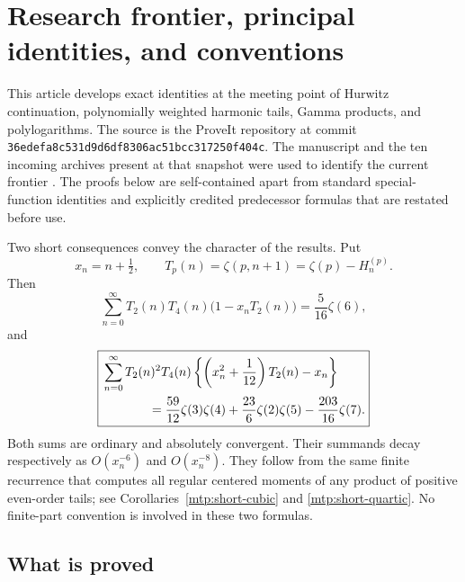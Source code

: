 \section{Research frontier, principal identities, and conventions}
\label{sec:overview}

This article develops exact identities at the meeting point of
Hurwitz continuation, polynomially weighted harmonic tails, Gamma
products, and polylogarithms. The source is the ProveIt repository
at commit
\texttt{36edefa8c531d9d6df8306ac51bcc317250f404c}.
The manuscript and the ten incoming archives present at that snapshot
were used to identify the current frontier
\cite{RepoManuscript,RepoIncoming}. The proofs below are self-contained
apart from standard special-function identities and explicitly
credited predecessor formulas that are restated before use.

Two short consequences convey the character of the results. Put
\[
 x_n=n+\tfrac12,\qquad
 T_p(n)=\zeta(p,n+1)=\zeta(p)-H_n^{(p)}.
\]
Then
\begin{equation}\label{eq:overview-cubic}
 \boxed{\sum_{n=0}^{\infty}T_2(n)T_4(n)
                  \bigl(1-x_nT_2(n)\bigr)=\frac5{16}\zeta(6),}
\end{equation}
and
\begin{equation}\label{eq:overview-quartic}
 \boxed{\begin{aligned}
 &\sum_{n=0}^{\infty}T_2(n)^2T_4(n)
       \left\{\left(x_n^2+\frac1{12}\right)T_2(n)-x_n\right\}\\
 &\hspace{13mm}
 =\frac{59}{12}\zeta(3)\zeta(4)
       +\frac{23}{6}\zeta(2)\zeta(5)-\frac{203}{16}\zeta(7).
 \end{aligned}}
\end{equation}
Both sums are ordinary and absolutely convergent. Their summands
decay respectively as \(O(x_n^{-6})\) and \(O(x_n^{-8})\).
They follow from the same finite recurrence that computes all
regular centered moments of any product of positive even-order tails;
see Corollaries~\ref{mtp:short-cubic} and \ref{mtp:short-quartic}.
No finite-part convention is involved in these two formulas.

\subsection{What is proved}

